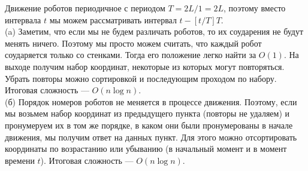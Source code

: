 \documentclass{article}
\begin{document}
Движение роботов периодичное с периодом $T = 2L/1 = 2L$, поэтому вместо интервала $t$ мы можем рассматривать интервал $t - [t/T]T$.\\
(a) Заметим, что если мы не будем различать роботов, то их соударения не будут менять ничего. Поэтому мы просто можем считать, что каждый робот соударяется только со стенками. Тогда его положение легко найти за $O(1)$. На выходе получим набор координат, некоторые из которых могут повторяться. Убрать повторы можно сортировкой и последующим проходом по набору. Итоговая сложность --- $O(n \log n)$.\\
(б) Порядок номеров роботов не меняется в процессе движения. Поэтому, если мы возьмем набор координат из предыдущего пункта (повторы не удаляем) и пронумеруем их в том же порядке, в каком они были пронумерованы в начале движения, мы получим ответ на данных пункт. Для этого можно отсортировать координаты по возрастанию или убыванию (в начальный момент и в момент времени $t$). Итоговая сложность --- $O(n \log n)$. 
\end{document}
